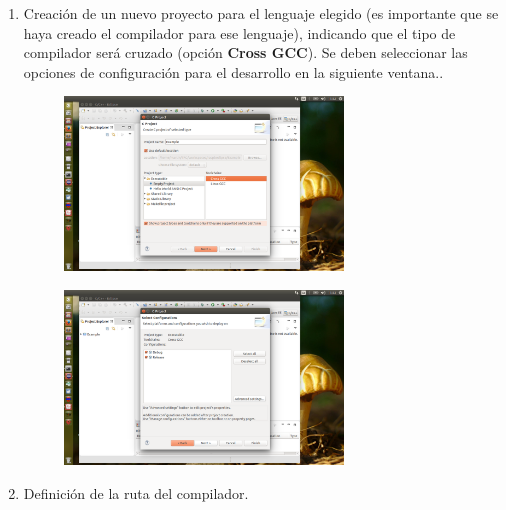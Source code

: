 \documentclass{article}
\begin{document}
\begin{enumerate}
\item Creación de un nuevo proyecto para el lenguaje elegido (es importante que se haya creado el compilador para ese lenguaje), indicando que el tipo de compilador será cruzado (opción \textbf{Cross GCC}). Se deben seleccionar las opciones de configuración para el desarrollo en la siguiente ventana..

\begin{figure}[H]
\centering
\includegraphics[width=0.7\textwidth]{Recursos/raspbeclipse/projectcreation}
\end{figure}
\begin{figure}[H]
\centering
\includegraphics[width=0.7\textwidth]{Recursos/raspbeclipse/configurations}
\end{figure}

\item Definición de la ruta del compilador.


\end{enumerate}
\end{document}
